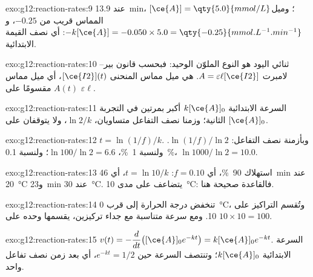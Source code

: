 \begin{solution}{exo:g12:reaction-rates:9}
عند \qty{13.9}{min}، $[\ce{A}] = \qty{5.0}{mmol/L}$؛ وميل المماس
قريب من $-0.25$، و$-k[\ce{A}] = -0.050 \times 5.0 =
\qty{-0.25}{mmol.L^{-1}.min^{-1}}$: أي نصف القيمة الابتدائية.
\end{solution}

\begin{solution}{exo:g12:reaction-rates:10}
ثنائي اليود هو النوع الملوّن الوحيد: فبحسب قانون بير--لامبرت
$A = \varepsilon \ell [\ce{I2}]$.  هي ميل
مماس المنحنى $[\ce{I2}](t)$، أي ميل
مماس $A(t)$ مقسومًا على $\varepsilon \ell$.
\end{solution}

\begin{solution}{exo:g12:reaction-rates:11}
السرعة الابتدائية $k[\ce{A}]_0$ أكبر بمرتين في التجربة الثانية؛
وزمنا نصف التفاعل متساويان، $\ln 2 / k$، ولا يتوقفان على $[\ce{A}]_0$.
\end{solution}

\begin{solution}{exo:g12:reaction-rates:12}
$t = \ln(1/f)/k$. وبأزمنة نصف التفاعل: $\ln(1/f)/\ln 2$. ولنسبة \qty{1}{\percent}،
$\ln 100 / \ln 2 = 6.6$؛ ولنسبة \qty{0.1}{\percent}، $\ln 1000 / \ln 2 =
10.0$.
\end{solution}

\begin{solution}{exo:g12:reaction-rates:13}
استهلاك \qty{90}{\percent}، أي $f = 0.10$: $t = \ln 10 / k$، أي
\qty{46}{min} عند \qty{20}{\celsius} و\qty{23}{min} عند \qty{30}{\celsius}.
 يتضاعف على مدى \qty{10}{\celsius}: فالقاعدة صحيحة هنا.
\end{solution}

\begin{solution}{exo:g12:reaction-rates:14}
تنخفض درجة الحرارة إلى قرب \qty{0}{\celsius}، وتُقسم التراكيز
على 10. ومع سرعة متناسبة مع جداء
تركيزين، يقسمها  وحده على $10 \times 10 = 100$.
\end{solution}

\begin{solution}{exo:g12:reaction-rates:15}
$v(t) = -\dfrac{d}{dt}\big([\ce{A}]_0 e^{-kt}\big) = k[\ce{A}]_0 e^{-kt}$.
السرعة الابتدائية $k[\ce{A}]_0$؛ وتنتصف السرعة حين $e^{-kt} = 1/2$، أي
بعد زمن نصف تفاعل واحد.
\end{solution}

